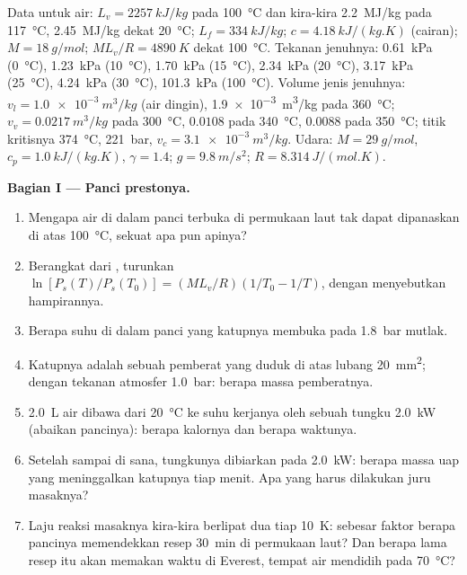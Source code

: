 \begin{problem}
\label{pb:b1:phase-changes:1}
Data untuk air: $L_v = \qty{2257}{kJ/kg}$ pada \qty{100}{\degreeCelsius} dan
kira-kira \qty{2.2}{MJ/kg} pada \qty{117}{\degreeCelsius}, \qty{2.45}{MJ/kg} dekat
\qty{20}{\degreeCelsius}; $L_f = \qty{334}{kJ/kg}$; $c = \qty{4.18}{kJ/(kg.K)}$
(cairan); $M = \qty{18}{g/mol}$; $ML_v/R = \qty{4890}{K}$ dekat
\qty{100}{\degreeCelsius}. Tekanan jenuhnya: \qty{0.61}{kPa}
(\qty{0}{\degreeCelsius}), \qty{1.23}{kPa} (\qty{10}{\degreeCelsius}), \qty{1.70}{kPa} (\qty{15}{\degreeCelsius}),
\qty{2.34}{kPa} (\qty{20}{\degreeCelsius}), \qty{3.17}{kPa} (\qty{25}{\degreeCelsius}), \qty{4.24}{kPa}
(\qty{30}{\degreeCelsius}), \qty{101.3}{kPa} (\qty{100}{\degreeCelsius}).
Volume jenis jenuhnya: $v_l = \qty{1.0e-3}{m^3/kg}$ (air dingin),
\qty{1.9e-3}{m^3/kg} pada \qty{360}{\degreeCelsius}; $v_v = \qty{0.0217}{m^3/kg}$
pada \qty{300}{\degreeCelsius}, $0.0108$ pada \qty{340}{\degreeCelsius}, $0.0088$
pada \qty{350}{\degreeCelsius}; titik kritisnya \qty{374}{\degreeCelsius},
\qty{221}{bar}, $v_c = \qty{3.1e-3}{m^3/kg}$. Udara: $M = \qty{29}{g/mol}$, $c_p =
\qty{1.0}{kJ/(kg.K)}$, $\gamma = 1.4$; $g = \qty{9.8}{m/s^2}$; $R =
\qty{8.314}{J/(mol.K)}$.

\medskip
\noindent\textbf{Bagian I --- Panci prestonya.}
\begin{enumerate}
  \item Mengapa air di dalam panci terbuka di permukaan laut tak dapat dipanaskan di atas
        \qty{100}{\degreeCelsius}, sekuat apa pun apinya?
  \item Berangkat dari , turunkan
        $\ln[P_s(T)/P_s(T_0)] = (ML_v/R)(1/T_0 - 1/T)$, dengan menyebutkan
        hampirannya.
  \item Berapa suhu di dalam panci yang katupnya membuka pada \qty{1.8}{bar}
        mutlak.
  \item Katupnya adalah sebuah pemberat yang duduk di atas lubang \qty{20}{mm^2};
        dengan tekanan atmosfer \qty{1.0}{bar}: berapa massa pemberatnya.
  \item \qty{2.0}{L} air dibawa dari \qty{20}{\degreeCelsius} ke suhu
        kerjanya oleh sebuah tungku \qty{2.0}{kW} (abaikan pancinya):
        berapa kalornya dan berapa waktunya.
  \item Setelah sampai di sana, tungkunya dibiarkan pada \qty{2.0}{kW}: berapa massa uap
        yang meninggalkan katupnya tiap menit. Apa yang harus dilakukan juru masaknya?
  \item Laju reaksi masaknya kira-kira berlipat dua tiap \qty{10}{K}:
        sebesar faktor berapa pancinya memendekkan resep \qty{30}{min} di
        permukaan laut? Dan berapa lama resep itu akan memakan waktu di Everest, tempat
        air mendidih pada \qty{70}{\degreeCelsius}?
\end{enumerate}


\end{problem}
